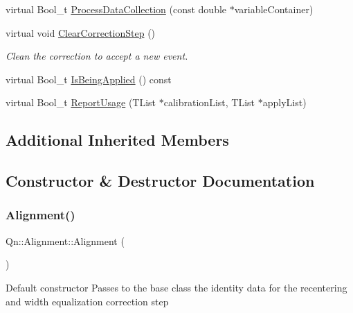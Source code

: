 \begin{DoxyCompactItemize}
virtual Bool\+\_\+t \mbox{\hyperlink{classQn_1_1Alignment_af071fa4f51958ecfec6e6c58a7d84c84}{Process\+Data\+Collection}} (const double $\ast$variable\+Container)
\item 
\mbox{\label{classQn_1_1Alignment_aba2ba181fbf1572b646ed0d225cb773b}} 
virtual void \mbox{\hyperlink{classQn_1_1Alignment_aba2ba181fbf1572b646ed0d225cb773b}{Clear\+Correction\+Step}} ()
\begin{DoxyCompactList}\small\item\em Clean the correction to accept a new event. \end{DoxyCompactList}\item 
virtual Bool\+\_\+t \mbox{\hyperlink{classQn_1_1Alignment_aaa38151d72ebf1aa97247ba07c4d16e5}{Is\+Being\+Applied}} () const
\item 
virtual Bool\+\_\+t \mbox{\hyperlink{classQn_1_1Alignment_af8ef33833778e9af4bdb7b82f679c941}{Report\+Usage}} (T\+List $\ast$calibration\+List, T\+List $\ast$apply\+List)
\end{DoxyCompactItemize}
\subsection*{Additional Inherited Members}


\subsection{Constructor \& Destructor Documentation}
\mbox{\label{classQn_1_1Alignment_aeeec4b4eac91478f48d89e453cb3e10a}} 
\subsubsection{\texorpdfstring{Alignment()}{Alignment()}}
{\footnotesize\ttfamily Qn\+::\+Alignment\+::\+Alignment (\begin{DoxyParamCaption}{ }\end{DoxyParamCaption})}

Default constructor Passes to the base class the identity data for the recentering and width equalization correction step \mbox{\label{classQn_1_1Alignment_ad364189f6410b258123d7bd9d8bf0373}} 
